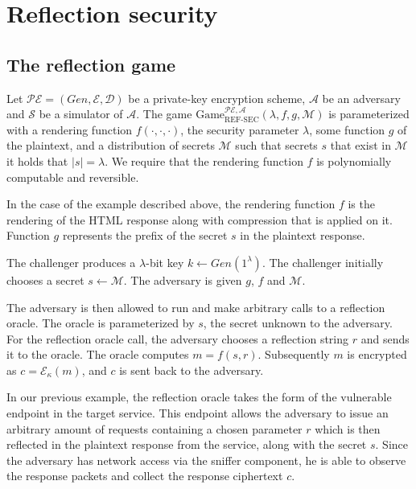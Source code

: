 \section{Reflection security}\label{sec:refsec}

\subsection{The reflection game}\label{subsec:refsecgame}

Let $\mathcal{PE} = (Gen, \mathcal{E}, \mathcal{D})$ be a private-key encryption
scheme, $\mathcal{A}$ be an adversary and $\mathcal{S}$ be a simulator of
$\mathcal{A}$. The game
$\text{Game}_{\text{REF-SEC}}^{\mathcal{PE},\mathcal{A}}(\lambda,  f, g,
\mathcal{M})$ is parameterized with a rendering function $f(\cdot, \cdot,
\cdot)$, the security parameter $\lambda$, some function $g$ of the plaintext,
and a distribution of secrets $\mathcal{M}$ such that secrets $s$ that exist in
$\mathcal{M}$ it holds that $|s| = \lambda$. We require that the rendering
function $f$ is polynomially computable and reversible.

In the case of the example described above, the rendering function $f$ is the
rendering of the HTML response along with compression that is applied on it.
Function $g$ represents the prefix of the secret $s$ in the plaintext response.

The challenger produces a $\lambda$-bit key $k \leftarrow Gen(1^\lambda)$. The
challenger initially chooses a secret $s \leftarrow \mathcal{M}$. The adversary
is given $g$, $f$ and $\mathcal{M}$.

The adversary is then allowed to run and make arbitrary calls to a reflection
oracle. The oracle is parameterized by $s$, the secret unknown to the adversary.
For the reflection oracle call, the adversary chooses a reflection string $r$
and sends it to the oracle. The oracle computes $m = f(s, r)$. Subsequently $m$
is encrypted as $c = \mathcal{E}_\kappa(m)$, and $c$ is sent back to the
adversary.

In our previous example, the reflection oracle takes the form of the vulnerable
endpoint in the target service. This endpoint allows the adversary to issue an
arbitrary amount of requests containing a chosen parameter $r$ which is then
reflected in the plaintext response from the service, along with the secret $s$.
Since the adversary has network access via the sniffer component, he is able to
observe the response packets and collect the response ciphertext $c$.

